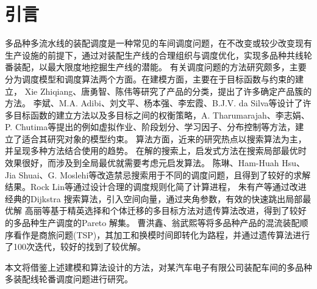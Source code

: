 \chapter{引言}
多品种多流水线的装配调度是一种常见的车间调度问题，在不改变或较少改变现有生产设施的前提下，通过对装配生产线的合理组织与调度优化，实现多品种共线轮番装配，以最大限度地挖掘生产线的潜能。
有关调度问题的方法研究颇多，主要分为调度模型和调度算法两个方面。在建模方面，主要在于目标函数与约束的建立，
Xie Zhiqiang\cite{xie2010study}、唐勇智\cite{唐勇智2009基于聚类的}、陈伟\cite{陈伟2006生物信息学中的序列相似性比对算法}等研究了产品的分类，提出了许多确定产品簇的方法。
李斌\cite{李斌2009}、M.A. Adibi\cite{adibi2010multi}、刘文平\cite{刘文平2009}、杨本强\cite{杨本强2002}、李宏霞\cite{李宏霞2006}、B.J.V. da Silva\cite{da2014production}等设计了许多目标函数的建立方法以及多目标之间的权衡策略，A. Tharumarajah\cite{1998distributed}、李志娟\cite{李志娟2008}、P. Chutima\cite{chutima2014pareto}等提出的例如虚拟作业、阶段划分、学习因子、分布控制等方法，建立了适合其研究对象的模型约束。
算法方面，近来的研究热点以搜索算法为主，并呈现多种方法结合使用的趋势。
在解的搜索上，启发式方法在搜索局部最优时效果很好，而涉及到全局最优就需要考虑元启发算法。
陈琳\cite{陈琳2009}、Ham-Huah Hsu\cite{hsu1995fully}、Jia Shuai\cite{jia2014path}、G. Moslehi\cite{moslehi2011pareto}等改造禁忌搜索用于不同的调度问题，且得到了较好的求解结果。Rock Lin\cite{lin2012case}等通过设计合理的调度规则化简了计算进程，
朱有产\cite{朱有产2006}等通过改进经典的Dijkstra 搜索算法，引入空间向量，通过夹角参数，有效的快速跳出局部最优解
高丽\cite{高丽2012}等基于精英选择和个体迁移的多目标方法对遗传算法改进，得到了较好的多品种生产调度的Pareto 解集。
曹洪鑫\cite{曾洪鑫2006}、翁武熙\cite{翁武熙2012混合蚁群算法求解}等将多品种产品的混流装配顺序看作是商旅问题(TSP)，其加工和换模时间即转化为路程，并通过遗传算法进行了100次迭代，较好的找到了较优解。

本文将借鉴上述建模和算法设计的方法，对某汽车电子有限公司装配车间的多品种多装配线轮番调度问题进行研究。


